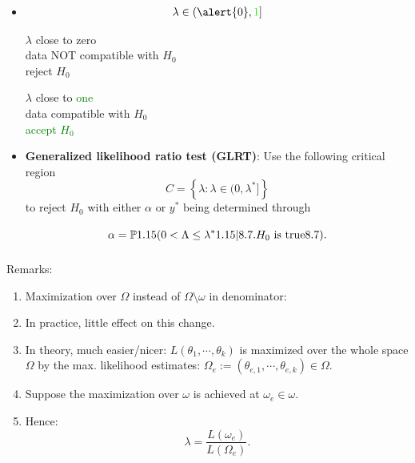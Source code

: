 \begin{frame}

\begin{itemize}
	\item[]
	\begin{align*}
		\lambda\in (\alert{0},\textcolor{green}{1}]
	\end{align*}
	\begin{center}
\begin{minipage}{0.45\textwidth}
	\begin{center}
		$\lambda$ close to \alert{zero} \\
		data NOT compatible with $H_0$ \\
		\alert{reject $H_0$}
	\end{center}
\end{minipage}
\hfill
\begin{minipage}{0.45\textwidth}
	\begin{center}
		$\lambda$ close to \textcolor{green}{one} \\
		data compatible with $H_0$ \\
		\textcolor{green}{accept $H_0$}
	\end{center}
\end{minipage}
	\end{center}
		\vfill
	\item \textcolor{yellow!80!black}{\bf Generalized likelihood ratio test (GLRT)}: Use the following critical region
		\[
			C =\left\{\lambda: \lambda\in(0,\lambda^*]\right\}
		\]
		to reject $H_0$ with either $\alpha$ or $y^*$ being determined through
		\[
			\alpha = \bbP\left(0<\Lambda\le \lambda^*\bigg| \text{$H_0$ is true}\right).
		\]
\end{itemize}
\end{frame}
\begin{frame}
	Remarks:\\[1em]
	\begin{enumerate}
		\item Maximization over $\Omega$ instead of $\Omega\setminus\omega$ in denominator:
		\item[]		In practice, little effect on this change.
		\item[]	In theory, much easier/nicer: $L(\theta_1,\cdots,\theta_k)$ is maximized over the whole space $\Omega$ by the max. likelihood estimates: $\Omega_e:=(\theta_{e,1},\cdots,\theta_{e,k})\in\Omega$.
			\vfill
		\item Suppose the maximization over $\omega$ is achieved at $\omega_e\in\omega$.
			\vfill
		\item Hence:
			\[
			\lambda = \frac{L(\omega_e)}{L(\Omega_e)}.
			\]
\end{enumerate}
\end{frame}
